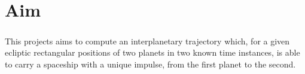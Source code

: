 \chapter{Aim}
\paragraph{} This projects aims to compute an interplanetary trajectory which, for a given ecliptic rectangular positions of two planets in two known time instances, is able to carry a spaceship with a unique impulse, from the first planet to the second.
